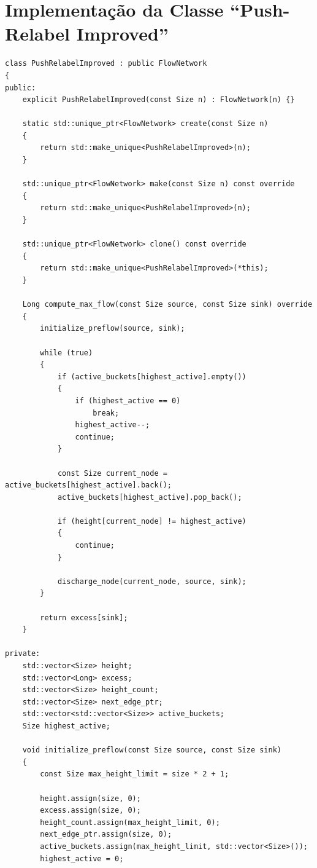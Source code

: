 \documentclass[12pt,a4paper]{article}
\begin{document}
\newpage
\section{Implementação da Classe ``Push-Relabel Improved''}
\label{ap:push_relabel_improved}

\begin{lstlisting}[caption={Implementação em C++ da classe \lstinline{PushRelabelImproved}, otimizada empiricamente com a Heurística de Lacuna (\textit{Gap Heuristic}).}, label={lst:push_relabel_improved}]
class PushRelabelImproved : public FlowNetwork
{
public:
	explicit PushRelabelImproved(const Size n) : FlowNetwork(n) {}

	static std::unique_ptr<FlowNetwork> create(const Size n)
	{
		return std::make_unique<PushRelabelImproved>(n);
	}

	std::unique_ptr<FlowNetwork> make(const Size n) const override
	{
		return std::make_unique<PushRelabelImproved>(n);
	}

	std::unique_ptr<FlowNetwork> clone() const override
	{
		return std::make_unique<PushRelabelImproved>(*this);
	}

	Long compute_max_flow(const Size source, const Size sink) override
	{
		initialize_preflow(source, sink);

		while (true)
		{
			if (active_buckets[highest_active].empty())
			{
				if (highest_active == 0)
					break;
				highest_active--;
				continue;
			}

			const Size current_node = active_buckets[highest_active].back();
			active_buckets[highest_active].pop_back();

			if (height[current_node] != highest_active)
			{
				continue;
			}

			discharge_node(current_node, source, sink);
		}

		return excess[sink];
	}

private:
	std::vector<Size> height;
	std::vector<Long> excess;
	std::vector<Size> height_count;
	std::vector<Size> next_edge_ptr;
	std::vector<std::vector<Size>> active_buckets;
	Size highest_active;

	void initialize_preflow(const Size source, const Size sink)
	{
		const Size max_height_limit = size * 2 + 1;

		height.assign(size, 0);
		excess.assign(size, 0);
		height_count.assign(max_height_limit, 0);
		next_edge_ptr.assign(size, 0);
		active_buckets.assign(max_height_limit, std::vector<Size>());
		highest_active = 0;


\end{lstlisting}
\end{document}
